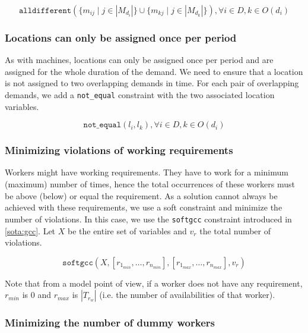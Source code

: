 \documentclass[../../thesis.tex]{subfiles}
\begin{document}
\begin{equation}
  \label{}
  \texttt{alldifferent}(\{ m_{ij} \mid j \in |M_{d_i}| \} \cup \{ m_{kj} \mid j \in |M_{d_k}| \}), \forall i \in D, k \in O(d_i)
\end{equation}

\subsubsection{Locations can only be assigned once per period}

As with machines, locations can only be assigned once per period and are assigned for the whole duration of the demand. We need 
to ensure that a location is not assigned to two overlapping demands in time. For each pair of overlapping demands,
we add a \texttt{not_equal} constraint with the two associated location variables.

\begin{equation}
  \label{}
  \texttt{not_equal}(l_{i}, l_{k}), \forall i \in D, k \in O(d_i)
\end{equation}


\subsubsection{Minimizing violations of working requirements}

Workers might have working requirements. They have to work for a minimum (maximum) number of times, hence the total 
occurrences of these workers must be above (below) or equal the requirement. As a solution cannot always be 
achieved with these requirements, we use a soft constraint and minimize the number of violations. In this case,
we use the \texttt{softgcc} constraint introduced in \autoref{sota:gcc}. Let $X$ be the entire set of variables and 
$v_r$ the total number of violations.

\begin{equation}
  \texttt{softgcc}(X, [r_{1_{min}}, \dots, r_{n_{min}}], [r_{1_{max}}, \dots, r_{n_{max}}], v_{r}) \label{cp:wrequirements} 
\end{equation}

Note that from a model point of view, if a worker does not have any requirement, $r_{min}$ is 0 and $r_{max}$ is $|T_{r_w}| $ (i.e. the number of availabilities of that worker).


\subsubsection{Minimizing the number of dummy workers}
\end{document}
